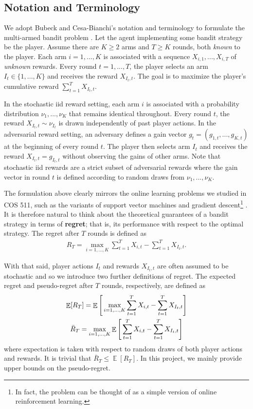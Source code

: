 \documentclass[12pt]{article}
\DeclareMathOperator*{\E}{\mathbb{E}}
\begin{document}
\subsection{Notation and Terminology}

We adopt Bubeck and Cesa-Bianchi's notation and terminology to formulate the multi-armed bandit problem \cite{bubeck2012}. Let the agent implementing some bandit strategy be the player. Assume there are $K\geq 2$ arms and $T\geq K$ rounds, both \textit{known} to the player. Each arm $i=1,...,K$ is associated with a sequence $X_{i,1},...,X_{i,T}$ of \textit{unknown} rewards. Every round $t=1,...,T$, the player selects an arm $I_{t}\in\{1,...,K\}$ and receives the reward $X_{I_{t},t}$. The goal is to maximize the player's cumulative reward $\sum_{t=1}^{T}X_{I_{t},t}$.

In the stochastic iid reward setting, each arm $i$ is associated with a probability distribution $\nu_{1},...,\nu_{K}$ that remains identical throughout. Every round $t$, the reward $X_{I_{t},t}\sim\nu_{I_{t}}$ is drawn independently of past player actions. In the adversarial reward setting, an adversary defines a gain vector $g_{t}=(g_{1,t},...,g_{K,t})$ at the beginning of every round $t$. The player then selects arm $I_{t}$ and receives the reward $X_{I_{t},t}=g_{I_{t},t}$ without observing the gains of other arms. Note that stochastic iid rewards are a strict subset of adversarial rewards where the gain vector in round $t$ is defined according to random draws from $\nu_{1},...,\nu_{K}$.

The formulation above clearly mirrors the online learning problems we studied in COS 511, such as the variants of support vector machines \cite{lecture16} and gradient descent\footnote{In fact, the problem can be thought of as a simple version of online reinforcement learning.} \cite{lecture18}. It is therefore natural to think about the theoretical guarantees of a bandit strategy in terms of \textbf{regret}; that is, its performance with respect to the optimal strategy. The regret after $T$ rounds is defined as
\begin{align}
R_{T}=\max_{i=1,...,K}\sum_{t=1}^{T}X_{i,t}-\sum_{t=1}^{T}X_{I_{t},t}.
\end{align}

With that said, player actions $I_{t}$ and rewards $X_{I_{t},t}$ are often assumed to be stochastic and so we introduce two further definitions of regret. The expected regret and pseudo-regret after $T$ rounds, respectively, are defined as
\begin{gather}
\E[R_{T}]=\E\Bigg{[}\max_{i=1,...,K}\sum_{t=1}^{T}X_{i,t}-\sum_{t=1}^{T}X_{I_{t},t}\Bigg{]} \\
\bar{R}_{T}=\max_{i=1,...,K}\E\Bigg{[}\sum_{t=1}^{T}X_{i,t}-\sum_{t=1}^{T}X_{I_{t},t}\Bigg{]}
\end{gather}
where expectation is taken with respect to random draws of both player actions and rewards. It is trivial that $\bar{R}_{T}\leq\E[R_{T}]$. In this project, we mainly provide upper bounds on the pseudo-regret.
\end{document}

